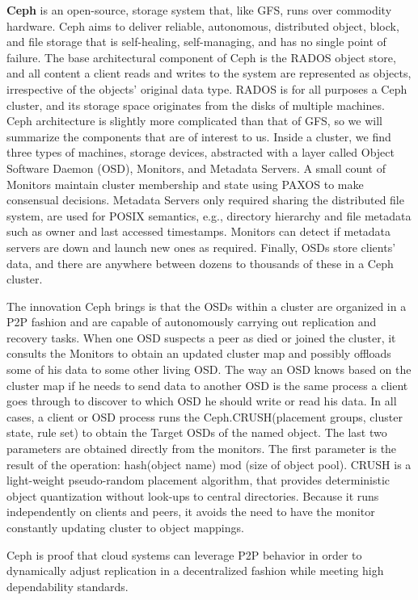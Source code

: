 \documentclass[runningheads]{llncs}
\begin{document}
\textbf{Ceph} is an open-source, storage system that, like GFS, runs over commodity hardware. Ceph aims to deliver reliable, autonomous, distributed object, block, and file storage that is self-healing, self-managing, and has no single point of failure. The base architectural component of Ceph is the RADOS object store, and all content a client reads and writes to the system are represented as objects, irrespective of the objects' original data type. RADOS is for all purposes a Ceph cluster, and its storage space originates from the disks of multiple machines. Ceph architecture is slightly more complicated than that of GFS, so we will summarize the components that are of interest to us. Inside a cluster, we find three types of machines, storage devices, abstracted with a layer called Object Software Daemon (OSD), Monitors, and Metadata Servers. A small count of Monitors maintain cluster membership and state using PAXOS to make consensual decisions. Metadata Servers only required sharing the distributed file system, are used for POSIX semantics, e.g., directory hierarchy and file metadata such as owner and last accessed timestamps. Monitors can detect if metadata servers are down and launch new ones as required. Finally, OSDs store clients' data, and there are anywhere between dozens to thousands of these in a Ceph cluster.

The innovation Ceph brings is that the OSDs within a cluster are organized in a P2P fashion and are capable of autonomously carrying out replication and recovery tasks. When one OSD suspects a peer as died or joined the cluster, it consults the Monitors to obtain an updated cluster map and possibly offloads some of his data to some other living OSD. The way an OSD knows based on the cluster map if he needs to send data to another OSD is the same process a client goes through to discover to which OSD he should write or read his data. In all cases, a client or OSD process runs the Ceph.CRUSH(placement groups, cluster state, rule set) to obtain the Target OSDs of the named object. The last two parameters are obtained directly from the monitors. The first parameter is the result of the operation: hash(object name) mod (size of object pool). CRUSH \cite{crush} is a light-weight pseudo-random placement algorithm, that provides deterministic object quantization without look-ups to central directories. Because it runs independently on clients and peers, it avoids the need to have the monitor constantly updating cluster to object mappings.

Ceph is proof that cloud systems can leverage P2P behavior in order to dynamically adjust replication in a decentralized fashion while meeting high dependability standards. \cite{ceph, ceph_benchmarks}
\end{document}
